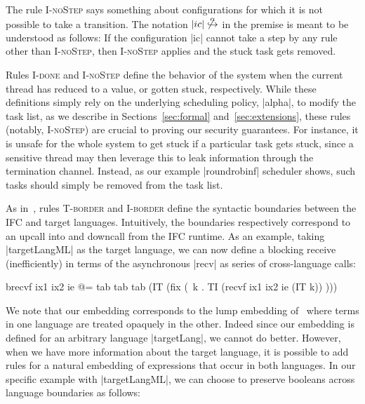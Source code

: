 The rule \textsc{I-noStep} says something about configurations for which
it is not possible to take a transition.  The notation
$|ic|\not\overset{\alpha}{\hookrightarrow}$ in the premise
is meant to be understood as
follows:  If the configuration |ic| cannot take a step by any rule other
than \textsc{I-noStep}, then \textsc{I-noStep} applies and the
stuck task gets removed.

Rules \textsc{I-done} and \textsc{I-noStep} define the behavior of the system
when the current thread has reduced to a value, or gotten stuck, respectively.
%
While these definitions simply rely on the underlying scheduling policy,
|alpha|, to modify the task list, as we describe in Sections~\ref{sec:formal}
and~\ref{sec:extensions}, these rules (notably, \textsc{I-noStep}) are crucial
to proving our security guarantees.
%
For instance, it is unsafe for the whole system to get stuck if a particular
task gets stuck, since a sensitive thread may then leverage this to leak
information through the termination channel.
%
Instead, as our example |roundrobinf| scheduler shows, such tasks should simply
be removed from the task list.

%
As in~\cite{Matthews:2007:OSM:1190216.1190220}, rules \textsc{T-border} and
\textsc{I-border} define the syntactic boundaries between the IFC and target
languages.
%
Intuitively, the boundaries respectively correspond to an upcall into and
downcall from the IFC runtime.
%
As an example, taking |targetLangML| as the target language, we can now define a
blocking receive (inefficiently) in terms of the asynchronous |recv| as series
of cross-language calls:
\begin{code}
  brecvf ix1 ix2 ie @=
  tab tab tab (IT (fix (\ k . TI (recvf ix1 ix2 ie (IT k)) )))
\end{code}

We note that our embedding corresponds to the lump embedding
of~\cite{Matthews:2007:OSM:1190216.1190220} where terms in one language are
treated opaquely in the other.
%
Indeed since our embedding is defined for an arbitrary language |targetLang|,
we cannot do better.
%
However, when we have more information about the target language, it is
possible to add rules for a natural embedding of expressions that occur in both
languages.  In our specific example with |targetLangML|, we can choose to
preserve booleans across language boundaries as follows:

